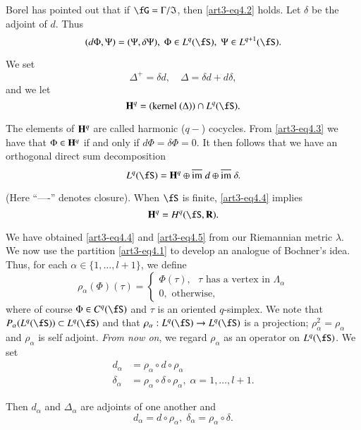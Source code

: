 \begin{remark*}
Borel has pointed out that if $\fG = \Gamma / \fI$, then \eqref{art3-eq4.2} holds. Let $\delta$ be the adjoint of $d$. Thus
\begin{equation}
(d \Phi, \Psi) = (\Psi , \delta \Psi), \; \Phi \in L^q (\fS), \; \Psi \in L^{q+1} (\fS). \label{art3-eq4.3}
\end{equation}

We set
$$
\Delta^+ = \delta d, \quad \Delta = \delta d + d \delta, 
$$
and we let
$$
\bH^q = (\text{kernel } (\Delta)) \cap L^q (\fS).
$$

The elements of $\mathbf{H}^q$ are called harmonic ($q-$) cocycles. From \eqref{art3-eq4.3} we have that $\Phi \in \mathbf{H}^q$ if and only if $d \Phi = \delta \Phi =0$. It then follows that we have an orthogonal direct sum decomposition
\begin{equation}
L^q (\fS) = \bH^q \oplus \overline{\im} \; d \oplus \overline{\im} \; \delta. \label{art3-eq4.4}
\end{equation}

(Here ``----'' denotes closure). When $\fS$ is finite, \eqref{art3-eq4.4} implies 
\begin{equation}
\bH^q = H^q (\fS, \bR). \label{art3-eq4.5}
\end{equation}

We have obtained \eqref{art3-eq4.4} and \eqref{art3-eq4.5} from our Riemannian metric $\lambda$. We now use the partition \eqref{art3-eq4.1} to develop an analogue of Bochner's idea. Thus, for each $\alpha \in \{1, \ldots, l +1\}$, we define
$$
\rho_{\alpha} (\Phi) (\tau) = 
\begin{cases}
\Phi (\tau), \text{ $\tau$ has a vertex in $\Lambda_\alpha$}\\
0, \text{ otherwise,}
\end{cases}
$$\pageoriginale
where of course $\Phi \in C^q (\fS)$ and $\tau$ is an oriented $q$-simplex. We note that $P_\alpha (L^q (\fS)) \subset L^q (\fS)$ and that $\rho_\alpha : L^q (\fS) \to L^q (\fS)$ is a projection; \iec $\rho^2_\alpha = \rho_\alpha$ and $\rho_{\alpha}$ is self adjoint. \textit{ From now on}, we regard $\rho_\alpha$ as an operator on $L^q(\fS)$. We set
\begin{align*}
d_{\alpha} & = \rho_\alpha \circ d \circ \rho_{\alpha}\\
\delta_{\alpha} & = \rho_{\alpha} \circ \delta \circ \rho_{\alpha}, \; \alpha = 1, \ldots, l + 1. 
\end{align*}

Then $d_{\alpha}$ and $\Delta_{\alpha}$ are adjoints of one another and 
\begin{equation}
d_{\alpha} = d \circ \rho_{\alpha}, \; \delta_{\alpha} = \rho_{\alpha} \circ \delta. \label{art3-eq4.6}
\end{equation}


\end{remark*}
